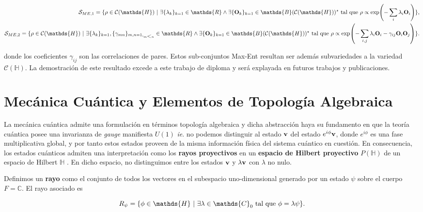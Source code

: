 \documentclass{report} %
\numberwithin{equation}{section}
\begin{document}
\begin{eqnarray*}
\mathcal{S}_{ME,1} = \{ \rho \in \mathcal{C}(\mathds{H}) \textnormal{ | } \exists \{\lambda_k\}_{k=1} \in \mathds{R} \land  \exists \{{\bf O}_{k}\}_{k=1} \in \mathds{B}(\mathcal{C}(\mathds{H}))^{\star}  \textnormal{ tal que }  \rho \propto \exp(-\sum_{i}\lambda_i {\bf O}_i) \}, \\
\mathcal{S}_{ME,2} = \{ \rho \in \mathcal{C}(\mathds{H}) \textnormal{ | } \exists \{\lambda_k\}_{k=1}, \{\gamma_{mn}\}_{m,n=1,_{m \mbox{\textless} n}} \in \mathds{R} 
\land  \exists \{{\bf O}_{k}\}_{k=1} \in \mathds{B}(\mathcal{C}(\mathds{H}))^{\star} \textnormal{ tal que }  \rho \propto \exp(-\sum_{i,j}\lambda_i {\bf O}_i - \gamma_{ij} {\bf O}_i {\bf O}_j ) \}. \end{eqnarray*}

donde los coeficientes $\gamma_{ij}$ son las correlaciones de pares. Estos sub-conjuntos Max-Ent resultan ser además subvariedades a la variedad $\mathcal{C}(\mathds{H})$. La demostración de este resultado excede a este trabajo de diploma y será explayada en futuros trabajos y publicaciones. 
    

\section{Mecánica Cuántica y Elementos de Topología Algebraica}

La mecánica cuántica admite una formulación en términos topología algebraica y dicha abstracción haya su fundamento en que la teoría cuántica posee una invarianza de \textit{gauge} manifiesta $U(1)$ \textit{ie}. no podemos distinguir al estado ${\bf v}$ del estado $e^{i \phi}{\bf v}$, donde $e^{i \phi}$ es una fase multiplicativa global, y por tanto estos estados proveen de la misma información física del sistema cuántico en cuestión. En consecuencia, los estados cuánticos admiten una interpretación como los \textbf{rayos proyectivos} en un \textbf{espacio de Hilbert proyectivo} $P(\mathds{H})$ de un espacio de Hilbert $\mathds{H}$ \cite{Hatcher:AT, GoldbartStone}. En dicho espacio, no distinguimos entre los estados ${\bf v}$ y $\lambda {\bf v}$ con $\lambda$ no nulo.

Definimos un \textbf{rayo} como el conjunto de todos los vectores en el subespacio uno-dimensional generado por un estado ${\psi}$ sobre el cuerpo $F = \mathds{C}$. El rayo asociado es 

$$
R_{\psi} = \{{\phi} \in \mathds{H}\textnormal{ | } \exists \lambda \in \mathds{C}_{0} \textnormal{ tal que } {\phi} = \lambda {\psi}\}.
$$
\end{document}

